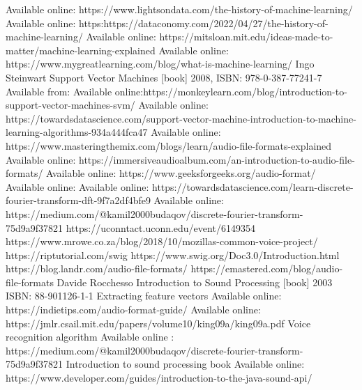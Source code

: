 \documentclass[english,12pt,oneside,a4paper]{article}
\begin{document}
\begin{center}
	\begin{thebibliography}{15}
		Available online: https://www.lightsondata.com/the-history-of-machine-learning/
		Available online: https:https://dataconomy.com/2022/04/27/the-history-of-machine-learning/
		Available online: https://mitsloan.mit.edu/ideas-made-to-matter/machine-learning-explained
		Available online: https://www.mygreatlearning.com/blog/what-is-machine-learning/
		Ingo Steinwart Support Vector Machines [book] 2008, ISBN: 978-0-387-77241-7
		Available from: 
		Available online:https://monkeylearn.com/blog/introduction-to-support-vector-machines-svm/
		Available online: https://towardsdatascience.com/support-vector-machine-introduction-to-machine-learning-algorithms-934a444fca47
		Available online:
		https://www.masteringthemix.com/blogs/learn/audio-file-formats-explained
		Available online: 
		https://immersiveaudioalbum.com/an-introduction-to-audio-file-formats/
		Available online:
		https://www.geeksforgeeks.org/audio-format/
		Available online:
		Available online:
		https://towardsdatascience.com/learn-discrete-fourier-transform-dft-9f7a2df4bfe9
		Available online:
		https://medium.com/@kamil2000budaqov/discrete-fourier-transform-75d9a9f37821
		https://uconntact.uconn.edu/event/6149354
		https://www.mrowe.co.za/blog/2018/10/mozillas-common-voice-project/
		https://riptutorial.com/swig
		https://www.swig.org/Doc3.0/Introduction.html
		https://blog.landr.com/audio-file-formats/
		https://emastered.com/blog/audio-file-formats
		Davide Rocchesso Introduction to Sound Processing [book] 2003\\ ISBN: 88-901126-1-1
		Extracting feature vectors
		Available online: https://indietips.com/audio-format-guide/
		 Available online:
		 https://jmlr.csail.mit.edu/papers/volume10/king09a/king09a.pdf
		 Voice recognition algorithm
		 Available online : https://medium.com/@kamil2000budaqov/discrete-fourier-transform-75d9a9f37821
		Introduction to sound processing book
		Available online: https://www.developer.com/guides/introduction-to-the-java-sound-api/
	\end{thebibliography}
\end{center}
\end{document}
